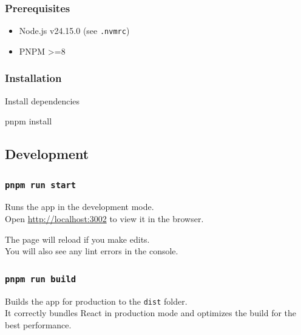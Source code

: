 \documentclass[
]{article}
\newenvironment{Shaded}{}{}
\newcommand{\ExtensionTok}[1]{#1}
\newcommand{\NormalTok}[1]{#1}
\providecommand{\tightlist}{%
  \setlength{\itemsep}{0pt}\setlength{\parskip}{0pt}}
\begin{document}
\hypertarget{prerequisites}{%
\subsubsection{Prerequisites}\label{prerequisites}}

\begin{itemize}
\tightlist
\item
  Node.js v24.15.0 (see \texttt{.nvmrc})
\item
  PNPM \textgreater=8
\end{itemize}

\hypertarget{installation}{%
\subsubsection{Installation}\label{installation}}

Install dependencies

\begin{Shaded}
\begin{Highlighting}[]
\ExtensionTok{pnpm}\NormalTok{ install}
\end{Highlighting}
\end{Shaded}

\hypertarget{development}{%
\subsection{Development}\label{development}}

\hypertarget{pnpm-run-start}{%
\subsubsection{\texorpdfstring{\texttt{pnpm\ run\ start}}{pnpm run start}}\label{pnpm-run-start}}

Runs the app in the development mode.\\
Open \url{http://localhost:3002} to view it in the browser.

The page will reload if you make edits.\\
You will also see any lint errors in the console.

\hypertarget{pnpm-run-build}{%
\subsubsection{\texorpdfstring{\texttt{pnpm\ run\ build}}{pnpm run build}}\label{pnpm-run-build}}

Builds the app for production to the \texttt{dist} folder.\\
It correctly bundles React in production mode and optimizes the build
for the best performance.
\end{document}
